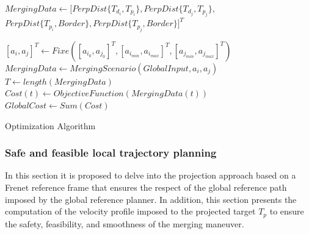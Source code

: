 \begin{algorithm}
\begin{small}
\DontPrintSemicolon
{}


$MergingData \leftarrow [PerpDist\{T_{d_{i}}, {T}_{p_{i}}\},PerpDist\{T_{d_{j}}, {T}_{p_j}\},$
$ PerpDist\{{T}_{p_i}, Border\}, PerpDist\{{T}_{p_j}, Border\}]^T $\;
{
  $[a_{i}, a_{j}]^T \leftarrow Fixe([{a_{i_{0}}}, {a_{j_{0}}}]^T, [{a}_{i}_{min}, {a}_{i}_{max}]^T,[{a}_{j}_{min}, {a}_{j}_{max}]^T )$\; 
   $MergingData \leftarrow MergingScenario(GlobalInput, a_i, a_j) $\; 
  $T \leftarrow length(MergingData)$ \;
  {
    $Cost(t) \leftarrow ObjectiveFunction(MergingData(t)) $
  }
  $GlobalCost \leftarrow Sum(Cost)$
  
}
\caption{Optimization Algorithm}\label{alg: optimization algorithm}
\end{small}

\end{algorithm}


\subsubsection{Safe and feasible local trajectory planning}  \label{sec:Projected_target}

In this section it is proposed to delve into the projection approach based on a Frenet reference frame that ensures the respect of the global reference path imposed by the global reference planner. In addition, this section presents the computation of the velocity profile imposed to the projected target $T_p$ to ensure the safety, feasibility, and smoothness of the merging maneuver. 

